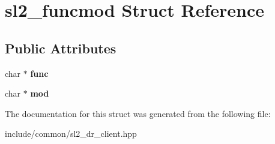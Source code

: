 \hypertarget{structsl2__funcmod}{}\section{sl2\+\_\+funcmod Struct Reference}
\label{structsl2__funcmod}
\subsection*{Public Attributes}
\begin{DoxyCompactItemize}
\item 
\mbox{\label{structsl2__funcmod_ab9d42c71b8c8e7e7bb24c4efa312e40e}} 
char $\ast$ {\bfseries func}
\item 
\mbox{\label{structsl2__funcmod_aaedd389e5f116800e83088d588cb8b4c}} 
char $\ast$ {\bfseries mod}
\end{DoxyCompactItemize}


The documentation for this struct was generated from the following file\+:\begin{DoxyCompactItemize}
\item 
include/common/sl2\+\_\+dr\+\_\+client.\+hpp\end{DoxyCompactItemize}
